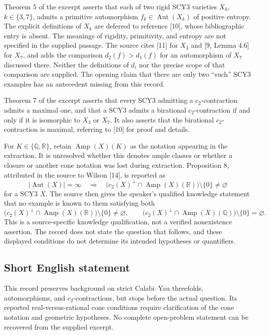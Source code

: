 \documentclass[11pt]{article}
\newcommand{\Q}{\mathbb{Q}}
\newcommand{\R}{\mathbb{R}}
\begin{document}
Theorem 5 of the excerpt asserts that each of two rigid SCY3 varieties \(X_k\), \(k\in\{3,7\}\), admits a primitive automorphism \(f_k\in\operatorname{Aut}(X_k)\) of positive entropy. The explicit definitions of \(X_k\) are deferred to reference [10], whose bibliographic entry is absent. The meanings of rigidity, primitivity, and entropy are not specified in the supplied passage. The source cites [11] for \(X_3\) and [9, Lemma 4.6] for \(X_7\), and adds the comparison \(d_2(f)>d_1(f)\) for an automorphism of \(X_7\) discussed there. Neither the definitions of \(d_i\) nor the precise scope of that comparison are supplied. The opening claim that there are only two ``such'' SCY3 examples has an antecedent missing from this record.

Theorem 7 of the excerpt asserts that every SCY3 admitting a \(c_2\)-contraction admits a maximal one, and that a SCY3 admits a birational \(c_2\)-contraction if and only if it is isomorphic to \(X_3\) or \(X_7\). It also asserts that the birational \(c_2\)-contraction is maximal, referring to [10] for proof and details.

For \(K\in\{\Q,\R\}\), retain \(\operatorname{Amp}(X)(K)\) as the notation appearing in the extraction. It is unresolved whether this denotes ample classes or whether a closure or another cone notation was lost during extraction. Proposition 8, attributed in the source to Wilson [14], is reported as
\[
|\operatorname{Aut}(X)|=\infty
\quad\Longrightarrow\quad
\bigl(c_2(X)^{\perp}\cap\operatorname{Amp}(X)(\R)\bigr)\setminus\{0\}\ne\varnothing
\]
for a SCY3 \(X\). The source then gives the speaker's qualified knowledge statement that no example is known to them satisfying both
\[
\bigl(c_2(X)^{\perp}\cap\operatorname{Amp}(X)(\R)\bigr)\setminus\{0\}\ne\varnothing,
\qquad
\bigl(c_2(X)^{\perp}\cap\operatorname{Amp}(X)(\Q)\bigr)\setminus\{0\}=\varnothing.
\]
This is a source-specific knowledge qualification, not a verified nonexistence assertion. The record does not state the question that follows, and these displayed conditions do not determine its intended hypotheses or quantifiers.
\subsection{Short English statement}
This record preserves background on strict Calabi--Yau threefolds, automorphisms, and \(c_2\)-contractions, but stops before the actual question. Its reported real-versus-rational cone conditions require clarification of the cone notation and geometric hypotheses. No complete open-problem statement can be recovered from the supplied excerpt.
\end{document}
